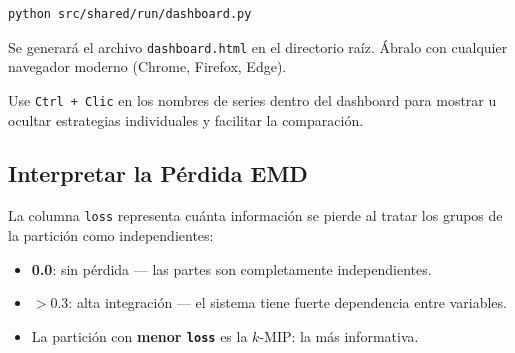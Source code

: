 \begin{lstlisting}[style=shell, caption={Generar el dashboard interactivo.}]
python src/shared/run/dashboard.py
\end{lstlisting}

Se generará el archivo \lstinline|dashboard.html| en el directorio raíz. Ábralo con cualquier navegador moderno (Chrome, Firefox, Edge).

\begin{tip}
Use \lstinline|Ctrl + Clic| en los nombres de series dentro del dashboard para mostrar u ocultar estrategias individuales y facilitar la comparación.
\end{tip}

\subsection{Interpretar la Pérdida EMD}

La columna \texttt{loss} representa cuánta información se pierde al tratar los grupos de la partición como independientes:

\begin{itemize}[itemsep=4pt]
    \item \textbf{0.0}: sin pérdida — las partes son completamente independientes.
    \item \textbf{$> 0.3$}: alta integración — el sistema tiene fuerte dependencia entre variables.
    \item La partición con \textbf{menor \texttt{loss}} es la $k$-MIP: la más informativa.
\end{itemize}
